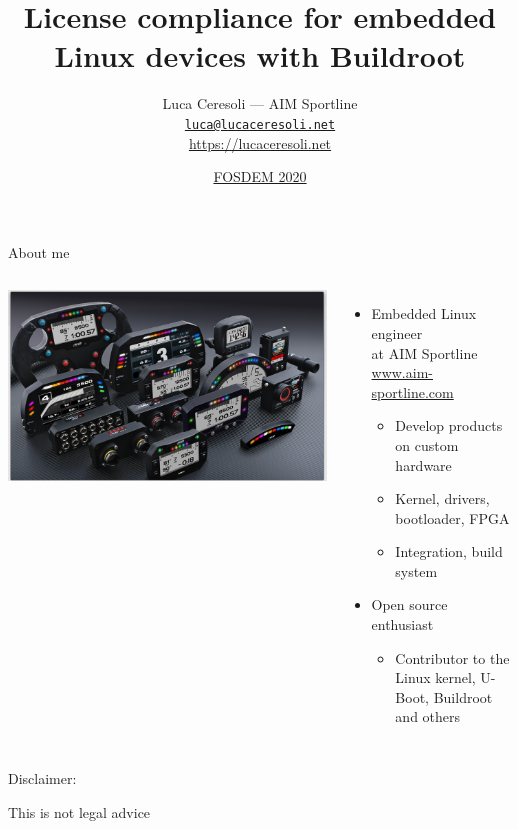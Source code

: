 \documentclass[xetex,table,table]{beamer}
\title{License compliance for embedded Linux devices with Buildroot}
\author{Luca Ceresoli --- AIM Sportline\\
  \href{mailto:luca@lucaceresoli.net}{\tt luca@lucaceresoli.net}\\
  \url{https://lucaceresoli.net}
}
\date{\href{https://fosdem.org/2020/schedule/event/buildroot_license_compliance/}{FOSDEM 2020}}
\begin{document}
\maketitle

\begin{frame}{About me}
  \begin{columns}
    \includegraphics[width=\textwidth]{../common/images/aim-products.jpg}

    \begin{itemize}
    \item Embedded Linux engineer\\
      at AIM Sportline\\
      {\footnotesize\href{https://www.aim-sportline.com/}{www.aim-sportline.com}}
      \begin{itemize}
      \item Develop products on custom hardware
      \item Kernel, drivers, bootloader, FPGA
      \item Integration, build system
      \end{itemize}
    \item Open source enthusiast
      \begin{itemize}
      \item Contributor to the Linux kernel, U-Boot, Buildroot and others
      \end{itemize}
    \end{itemize}
  \end{columns}
\end{frame}

\begin{frame}
  \Huge
  \begin{center}
    {\scalebox{3}{\Huge\faExclamationTriangle}}

    Disclaimer:

    This is not legal advice
  \end{center}
\end{frame}
\end{document}
